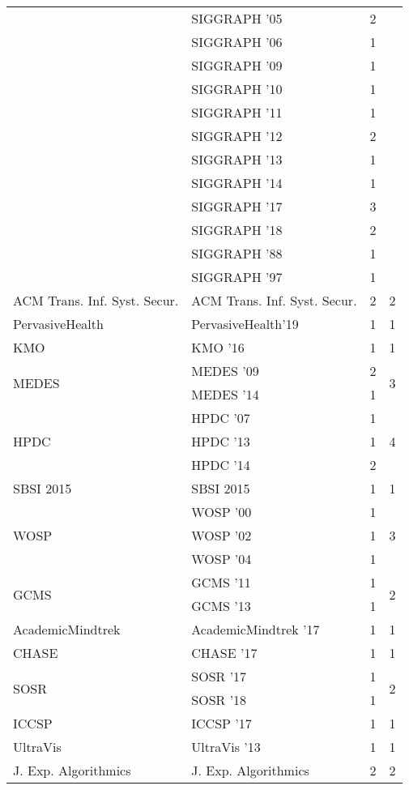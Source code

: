 \begin{table*}[t]
\begin{tabular}{llrr}
& SIGGRAPH '05 & 2 &\\
& SIGGRAPH '06 & 1 &\\
& SIGGRAPH '09 & 1 &\\
& SIGGRAPH '10 & 1 &\\
& SIGGRAPH '11 & 1 &\\
& SIGGRAPH '12 & 2 &\\
& SIGGRAPH '13 & 1 &\\
& SIGGRAPH '14 & 1 &\\
& SIGGRAPH '17 & 3 &\\
& SIGGRAPH '18 & 2 &\\
& SIGGRAPH '88 & 1 &\\
& SIGGRAPH '97 & 1 &\\
\multirow{1}{*}{ACM Trans. Inf. Syst. Secur.} & ACM Trans. Inf. Syst. Secur. & 2 & \multirow{1}{*}{2}\\
\multirow{1}{*}{PervasiveHealth} & PervasiveHealth'19 & 1 & \multirow{1}{*}{1}\\
\multirow{1}{*}{KMO } & KMO '16 & 1 & \multirow{1}{*}{1}\\
\multirow{2}{*}{MEDES } & MEDES '09 & 2 & \multirow{2}{*}{3}\\
& MEDES '14 & 1 &\\
\multirow{3}{*}{HPDC } & HPDC '07 & 1 & \multirow{3}{*}{4}\\
& HPDC '13 & 1 &\\
& HPDC '14 & 2 &\\
\multirow{1}{*}{SBSI 2015} & SBSI 2015 & 1 & \multirow{1}{*}{1}\\
\multirow{3}{*}{WOSP } & WOSP '00 & 1 & \multirow{3}{*}{3}\\
& WOSP '02 & 1 &\\
& WOSP '04 & 1 &\\
\multirow{2}{*}{GCMS } & GCMS '11 & 1 & \multirow{2}{*}{2}\\
& GCMS '13 & 1 &\\
\multirow{1}{*}{AcademicMindtrek } & AcademicMindtrek '17 & 1 & \multirow{1}{*}{1}\\
\multirow{1}{*}{CHASE } & CHASE '17 & 1 & \multirow{1}{*}{1}\\
\multirow{2}{*}{SOSR } & SOSR '17 & 1 & \multirow{2}{*}{2}\\
& SOSR '18 & 1 &\\
\multirow{1}{*}{ICCSP } & ICCSP '17 & 1 & \multirow{1}{*}{1}\\
\multirow{1}{*}{UltraVis } & UltraVis '13 & 1 & \multirow{1}{*}{1}\\
\multirow{1}{*}{J. Exp. Algorithmics} & J. Exp. Algorithmics & 2 & \multirow{1}{*}{2}\\

\end{tabular}
\end{table*}
